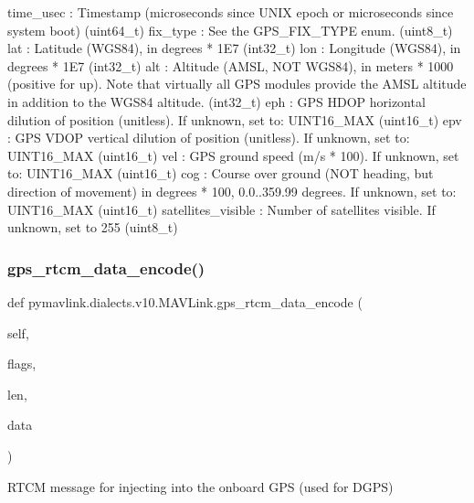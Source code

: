 \begin{DoxyVerb}
\begin{DoxyVerb}
\begin{DoxyVerb}
time_usec                 : Timestamp (microseconds since UNIX epoch or microseconds since system boot) (uint64_t)
fix_type                  : See the GPS_FIX_TYPE enum. (uint8_t)
lat                       : Latitude (WGS84), in degrees * 1E7 (int32_t)
lon                       : Longitude (WGS84), in degrees * 1E7 (int32_t)
alt                       : Altitude (AMSL, NOT WGS84), in meters * 1000 (positive for up). Note that virtually all GPS modules provide the AMSL altitude in addition to the WGS84 altitude. (int32_t)
eph                       : GPS HDOP horizontal dilution of position (unitless). If unknown, set to: UINT16_MAX (uint16_t)
epv                       : GPS VDOP vertical dilution of position (unitless). If unknown, set to: UINT16_MAX (uint16_t)
vel                       : GPS ground speed (m/s * 100). If unknown, set to: UINT16_MAX (uint16_t)
cog                       : Course over ground (NOT heading, but direction of movement) in degrees * 100, 0.0..359.99 degrees. If unknown, set to: UINT16_MAX (uint16_t)
satellites_visible        : Number of satellites visible. If unknown, set to 255 (uint8_t)\end{DoxyVerb}
 \mbox{\label{classpymavlink_1_1dialects_1_1v10_1_1MAVLink_a72398ef90750f1e2b535b9a8e75bbfd8}} 
\subsubsection{\texorpdfstring{gps\+\_\+rtcm\+\_\+data\+\_\+encode()}{gps\_rtcm\_data\_encode()}}
{\footnotesize\ttfamily def pymavlink.\+dialects.\+v10.\+M\+A\+V\+Link.\+gps\+\_\+rtcm\+\_\+data\+\_\+encode (\begin{DoxyParamCaption}\item[{}]{self,  }\item[{}]{flags,  }\item[{}]{len,  }\item[{}]{data }\end{DoxyParamCaption})}

\begin{DoxyVerb}RTCM message for injecting into the onboard GPS (used for DGPS)


\end{DoxyVerb}
\end{DoxyVerb}
\end{DoxyVerb}
